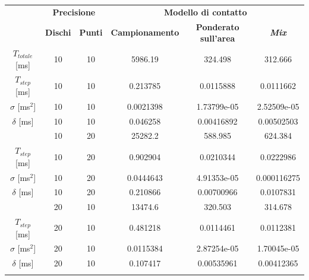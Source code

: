\begin{table}
	\centering
	\begin{tabular}{c|c|c|c|c|c|}
		\cline{2-6} 
		& \multicolumn{2}{c|}{\textbf{Precisione}} &\multicolumn{3}{c|}{\textbf{Modello di contatto}} \\
		\cline{2-6} 
		& \textbf{Dischi} & \textbf{Punti} & \textbf{Campionamento} & \textbf{Ponderato sull'area} & \textbf{\textit{Mix}} \\ 
		\hline
		\multicolumn{1}{|c|}{$T_{totale}$ [ms]} & 10 & 10 & 5986.19 & 324.498 & 312.666 \\ 
		\hline 
		\multicolumn{1}{|c|}{$T_{step}$ [ms]} & 10 & 10 & 0.213785 & 0.0115888 & 0.0111662 \\ 
		\hline 
		\multicolumn{1}{|c|}{$\sigma$ [ms$^2$]} & 10 & 10 & 0.0021398 & 1.73799e-05 & 2.52509e-05 \\ 
		\hline 
		\multicolumn{1}{|c|}{$\delta$ [ms]} & 10 & 10 & 0.046258 & 0.00416892 & 0.00502503 \\ 
		\hhline{======}

		\multicolumn{1}{|c|}{$T_{totale}$ [ms]} & 10 & 20 & 25282.2 & 588.985 & 624.384 \\ 
		\hline 
		\multicolumn{1}{|c|}{$T_{step}$ [ms]} & 10 & 20 & 0.902904 & 0.0210344 & 0.0222986 \\ 
		\hline 
		\multicolumn{1}{|c|}{$\sigma$ [ms$^2$]} & 10 & 20 & 0.0444643 & 4.91353e-05 & 0.000116275 \\ 
		\hline 
		\multicolumn{1}{|c|}{$\delta$ [ms]} & 10 & 20 & 0.210866 & 0.00700966 & 0.0107831 \\ 
		\hhline{======}
		
		\multicolumn{1}{|c|}{$T_{totale}$ [ms]} & 20 & 10 & 13474.6 & 320.503 & 314.678 \\ 
		\hline 
		\multicolumn{1}{|c|}{$T_{step}$ [ms]} & 20 & 10 & 0.481218 & 0.0114461 & 0.0112381 \\ 
		\hline 
		\multicolumn{1}{|c|}{$\sigma$ [ms$^2$]} & 20 & 10 & 0.0115384 & 2.87254e-05 & 1.70045e-05 \\ 
		\hline 
		\multicolumn{1}{|c|}{$\delta$ [ms]} & 20 & 10 & 0.107417 & 0.00535961 & 0.00412365 \\ 
		\hhline{======}
		

\end{tabular}
\end{table}
